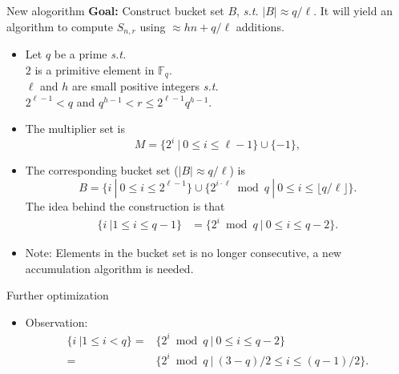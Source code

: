 \documentclass[final]{beamer}
\newlength{\onecolwid}
\begin{document}
\begin{frame}[t]
\begin{columns}[t]
\begin{column}{\onecolwid} 

\begin{block}{New alogorithm}
\small
	\textbf{Goal:} 	Construct bucket set $B$, \textit{s.t.} $|B|\approx q/\ell$. It will yield an algorithm to compute
	 $S_{n,r}$ using $\approx hn + q/\ell$ additions.
		
		\begin{itemize}	
			\item Let $q$ be a prime \textit{s.t.} \\
			$2$ is a primitive element in $\mathbb{F}_q$.\\
	 $\ell$ and $h$ are small positive integers \textit{s.t.}\\ $2^{\ell-1}<q$ and $q^{h-1} < r \le 2^{\ell-1} q^{h-1}$.
			\item The multiplier set is 
			\begin{equation*}\label{eq_multiplier_m_new}
			M =\{2^i\ |\ 0\le i\le \ell - 1\} \cup \{-1\},
			\end{equation*}
			\item The corresponding bucket set ($|B|\approx q/\ell$) is
			\begin{equation*}\label{eq_bucket_b_new}
			B =\{i\ | \ 0\le i\le 2^{\ell-1} \} \cup
			\{ 2^{i\cdot\ell}\bmod q\ |\ 0\le i \le \lfloor q/\ell \rfloor \}.
			\end{equation*}
			The idea behind the construction is that 
			\begin{equation*}
			\begin{aligned}
			\{i\ |1 \le i \le q-1 \} &= \{2^i \bmod q\ | \ 0\le i \le q-2\}.
			\end{aligned}
			\end{equation*}	
			
			\item Note: Elements in the bucket set is no longer consecutive, a new accumulation algorithm is needed.		
		\end{itemize}
\end{block}

\begin{block}{Further optimization}
\small
\begin{itemize}	
		\item	Observation: 										
		\begin{equation*}
				\begin{aligned}
				\{i\ |1 \le i < q \} =& \{2^i \bmod q\ | \ 0\le i \le q-2\}\\
				 =& \{2^i \bmod q\ | \ (3-q)/2\le i \le {(q-1)}/{2}\}.
				\end{aligned}
		\end{equation*}	


\end{itemize}
\end{block}
\end{column}
\end{columns}
\end{frame}
\end{document}
